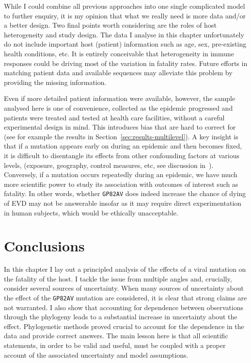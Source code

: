 While I could combine all previous approaches into one single complicated model to further enquiry, it is my opinion that what we really need is more data and/or a better design.
Two final points worth considering are the roles of host heterogeneity and study design.
The data I analyse in this chapter unfortunately do not include important host (patient) information such as age, sex, pre-existing health conditions, etc.
It is entirely conceivable that heterogeneity in immune responses could be driving most of the variation in fatality rates.
Future efforts in matching patient data and available sequences may alleviate this problem by providing the missing information.

Even if more detailed patient information were available, however, the sample analysed here is one of convenience, collected as the epidemic progressed and patients were treated and tested at health care facilities, without a careful experimental design in mind.
This introduces bias that are hard to correct for (see for example the results in Section~\ref{sec:results-multilevel}).
A key insight is that if a mutation appears early on during an epidemic and then becomes fixed, it is difficult to disentangle its effects from other confounding factors at various levels, (exposure, geography, control measures, etc, see discussion in~\cite{Diehl2016}).
Conversely, if a mutation occurs repeatedly during an epidemic, we have much more scientific power to study its association with outcomes of interest such as fatality.
In other words, whether \verb|GP82AV| does indeed increase the chance of dying of EVD may not be answerable insofar as it may require direct experimentation in human subjects, which would be ethically unacceptable.

\section{Conclusions}
\label{sec:conclusions}

In this chapter I lay out a principled analysis of the effects of a viral mutation on the fatality of the host.
I tackle the issue from multiple angles and, crucially, consider several sources of uncertainty.
When many sources of uncertainty about the effect of the \verb|GP82AV| mutation are considered, it is clear that strong claims are not warranted.
I also show that accounting for dependence between observations through the phylogeny leads to a substantial increase in uncertainty about the effect.
Phylogenetic methods proved crucial to account for the dependence in the data and provide correct answers.
The main lesson here is that all scientific statements, in order to be valid and useful, must be coupled with a proper account of the associated uncertainty and model assumptions.